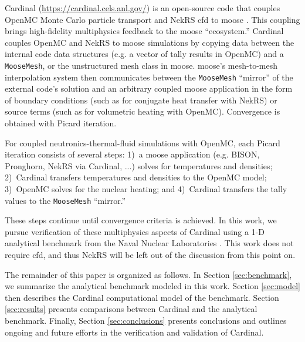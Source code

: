 \documentclass[letterpaper]{mc2023}
\begin{document}
Cardinal \cite{novak2022-cardinal,cardinal-website} (\url{https://cardinal.cels.anl.gov/}) is an open-source code that couples OpenMC
\cite{openmc} Monte Carlo particle transport and NekRS \gls{cfd} to \gls{moose} \cite{lindsay2022moose}. This coupling brings high-fidelity
multiphysics feedback to the \gls{moose} ``ecosystem.'' Cardinal couples OpenMC and NekRS to \gls{moose} simulations by copying data
between the internal code data structures (e.g. a vector of tally results in OpenMC) and a \texttt{MooseMesh}, or the unstructured mesh
class in \gls{moose}. \gls{moose}'s mesh-to-mesh interpolation system then communicates between the \texttt{MooseMesh} ``mirror'' of the
external code's solution and an arbitrary coupled \gls{moose} application in the form of boundary conditions (such as for conjugate heat
transfer with NekRS) or source terms (such as for volumetric heating with OpenMC). Convergence is obtained with Picard iteration.

For coupled neutronics-thermal-fluid simulations with OpenMC, each Picard iteration consists of several steps: 1)~a \gls{moose}
application (e.g. BISON, Pronghorn, NekRS via Cardinal, ...) solves for temperatures and densities; 2)~Cardinal transfers
temperatures and densities to the OpenMC model; 3)~OpenMC solves for the nuclear heating; and 4)~Cardinal transfers the tally
values to the \texttt{MooseMesh} ``mirror.''

These steps continue until convergence criteria is achieved. In this work, we pursue verification of these multiphysics aspects
of Cardinal using a 1-D analytical benchmark from the Naval Nuclear Laboratories \cite{analytical-benchmark}.  This work does
not require \gls{cfd}, and thus NekRS will be left out of the discussion from this point on.

The remainder of this paper is organized as follows. In Section \ref{sec:benchmark}, we summarize the analytical benchmark
modeled in this work. Section \ref{sec:model} then describes the Cardinal computational model of the benchmark. Section
\ref{sec:results} presents comparisons between Cardinal and the analytical benchmark. Finally, Section \ref{sec:conclusions}
presents conclusions and outlines ongoing and future efforts in the verification and validation of Cardinal.
\end{document}
